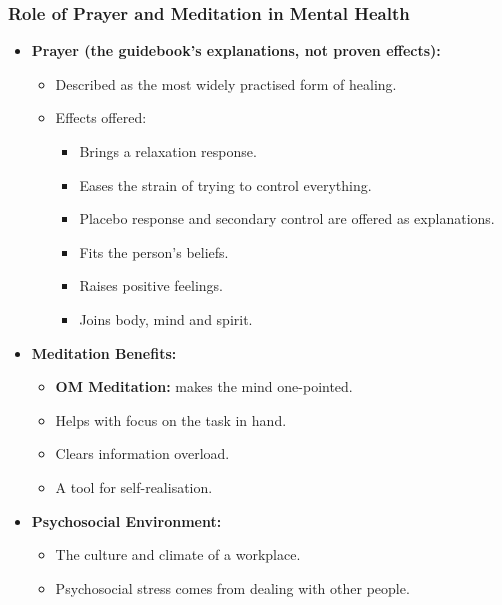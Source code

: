 \begin{frame}[fragile]\frametitle{Role of Prayer and Meditation in Mental Health}

      \begin{itemize}
        \item \textbf{Prayer (the guidebook's explanations, not proven effects):}
        \begin{itemize}
            \item Described as the most widely practised form of healing.
            \item Effects offered:
                \begin{itemize}
                    \item Brings a relaxation response.
                    \item Eases the strain of trying to control everything.
                    \item Placebo response and secondary control are offered as explanations.
                    \item Fits the person's beliefs.
                    \item Raises positive feelings.
                    \item Joins body, mind and spirit.
                \end{itemize}
        \end{itemize}
        \item \textbf{Meditation Benefits:}
        \begin{itemize}
            \item \textbf{OM Meditation:} makes the mind one-pointed.
            \item Helps with focus on the task in hand.
            \item Clears information overload.
            \item A tool for self-realisation.
        \end{itemize}
        \item \textbf{Psychosocial Environment:}
        \begin{itemize}
            \item The culture and climate of a workplace.
            \item Psychosocial stress comes from dealing with other people.
        \end{itemize}
      \end{itemize}

\end{frame}

